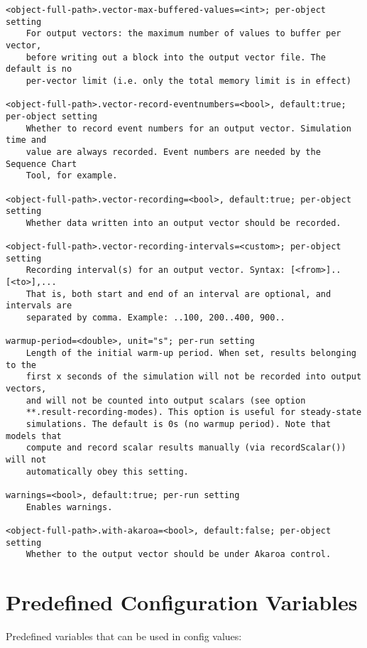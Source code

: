 \begin{verbatim}
<object-full-path>.vector-max-buffered-values=<int>; per-object setting
    For output vectors: the maximum number of values to buffer per vector,
    before writing out a block into the output vector file. The default is no
    per-vector limit (i.e. only the total memory limit is in effect)

<object-full-path>.vector-record-eventnumbers=<bool>, default:true; per-object setting
    Whether to record event numbers for an output vector. Simulation time and
    value are always recorded. Event numbers are needed by the Sequence Chart
    Tool, for example.

<object-full-path>.vector-recording=<bool>, default:true; per-object setting
    Whether data written into an output vector should be recorded.

<object-full-path>.vector-recording-intervals=<custom>; per-object setting
    Recording interval(s) for an output vector. Syntax: [<from>]..[<to>],...
    That is, both start and end of an interval are optional, and intervals are
    separated by comma. Example: ..100, 200..400, 900..

warmup-period=<double>, unit="s"; per-run setting
    Length of the initial warm-up period. When set, results belonging to the
    first x seconds of the simulation will not be recorded into output vectors,
    and will not be counted into output scalars (see option
    **.result-recording-modes). This option is useful for steady-state
    simulations. The default is 0s (no warmup period). Note that models that
    compute and record scalar results manually (via recordScalar()) will not
    automatically obey this setting.

warnings=<bool>, default:true; per-run setting
    Enables warnings.

<object-full-path>.with-akaroa=<bool>, default:false; per-object setting
    Whether to the output vector should be under Akaroa control.
\end{verbatim}


\section{Predefined Configuration Variables}

Predefined variables that can be used in config values:

